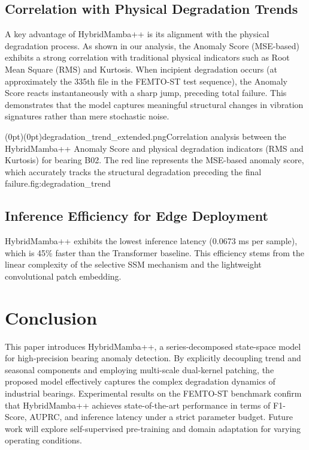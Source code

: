 \documentclass{ieeeaccess}
\begin{document}
{\subsection{Correlation with Physical Degradation Trends}
A key advantage of HybridMamba++ is its alignment with the physical degradation process. As shown in our analysis, the Anomaly Score (MSE-based) exhibits a strong correlation with traditional physical indicators such as Root Mean Square (RMS) and Kurtosis. When incipient degradation occurs (at approximately the 335th file in the FEMTO-ST test sequence), the Anomaly Score reacts instantaneously with a sharp jump, preceding total failure. This demonstrates that the model captures meaningful structural changes in vibration signatures rather than mere stochastic noise.

\Figure[t!](0pt)(0pt){degradation_trend_extended.png}{Correlation analysis between the HybridMamba++ Anomaly Score and physical degradation indicators (RMS and Kurtosis) for bearing B02. The red line represents the MSE-based anomaly score, which accurately tracks the structural degradation preceding the final failure.}{fig:degradation_trend}

\subsection{Inference Efficiency for Edge Deployment}
HybridMamba++ exhibits the lowest inference latency (0.0673 ms per sample), which is 45\% faster than the Transformer baseline. This efficiency stems from the linear complexity of the selective SSM mechanism and the lightweight convolutional patch embedding.

\section{Conclusion}
\label{sec:conclusion}

This paper introduces HybridMamba++, a series-decomposed state-space model for high-precision bearing anomaly detection. By explicitly decoupling trend and seasonal components and employing multi-scale dual-kernel patching, the proposed model effectively captures the complex degradation dynamics of industrial bearings. Experimental results on the FEMTO-ST benchmark confirm that HybridMamba++ achieves state-of-the-art performance in terms of F1-Score, AUPRC, and inference latency under a strict parameter budget. Future work will explore self-supervised pre-training and domain adaptation for varying operating conditions.

}
\end{document}

